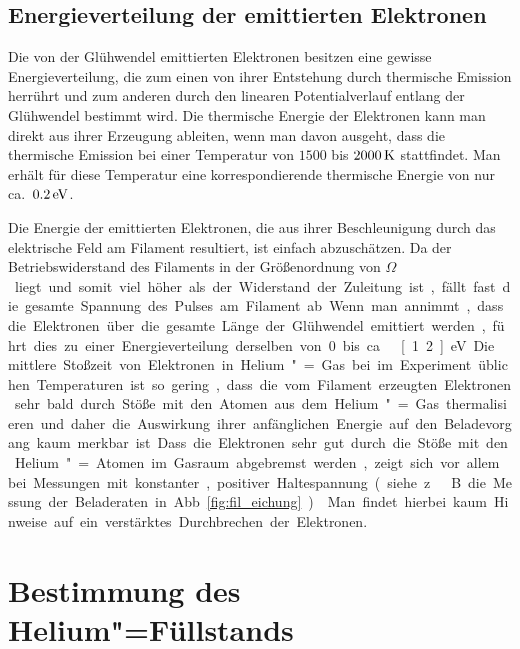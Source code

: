 \subsection{Energieverteilung der emittierten Elektronen}

Die von der Glühwendel emittierten Elektronen besitzen eine gewisse Energieverteilung, die zum einen von ihrer Entstehung durch thermische Emission herrührt und zum anderen durch den linearen Potentialverlauf entlang der Glühwendel bestimmt wird. Die thermische Energie der Elektronen kann man direkt aus ihrer Erzeugung ableiten, wenn man davon ausgeht, dass die thermische Emission bei einer Temperatur von $1500$ bis $\unit[2000]{K}$ stattfindet. Man erhält für diese Temperatur eine korrespondierende thermische Energie von nur ca.\ $\unit[0.2]{eV}$.

Die Energie der emittierten Elektronen, die aus ihrer Beschleunigung durch das elektrische Feld am Filament resultiert, ist einfach abzuschätzen. Da der Betriebswiderstand des Filaments in der Größenordnung von \unit[100]{$\Omega$} liegt und somit viel höher als der Widerstand der Zuleitung ist, fällt fast die gesamte Spannung des Pulses am Filament ab. Wenn man annimmt, dass die Elektronen über die gesamte Länge der Glühwendel emittiert werden, führt dies zu einer Energieverteilung derselben von 0 bis ca.\ \unit[1.2]{eV}.

Die mittlere Stoßzeit von Elektronen in Helium"=Gas bei im Experiment üblichen Temperaturen ist so gering, dass die vom Filament erzeugten Elektronen sehr bald durch Stöße mit den Atomen aus dem Helium"=Gas thermalisieren und daher die Auswirkung ihrer anfänglichen Energie auf den Beladevorgang kaum merkbar ist. Dass die Elektronen sehr gut durch die Stöße mit den Helium"=Atomen im Gasraum abgebremst werden, zeigt sich vor allem bei Messungen mit konstanter, positiver Haltespannung (siehe z.\ B. die Messung der Beladeraten in Abb.~\ref{fig:fil_eichung}). \enlargethispage{\baselineskip}Man findet hierbei kaum Hinweise auf ein verstärktes Durchbrechen der Elektronen.


\section{Bestimmung des Helium"=Füllstands}

